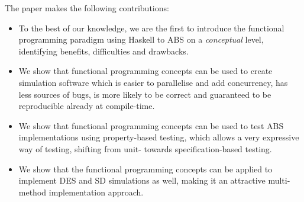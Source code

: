The paper makes the following contributions:

\begin{itemize}
	\item To the best of our knowledge, we are the first to introduce the functional programming paradigm using Haskell to ABS on a \textit{conceptual} level, identifying benefits, difficulties and drawbacks.
	\item We show that functional programming concepts can be used to create simulation software which is easier to parallelise and add concurrency, has less sources of bugs, is more likely to be correct and guaranteed to be reproducible already at compile-time.
	\item We show that functional programming concepts can be used to test ABS implementations using property-based testing, which allows a very expressive way of testing, shifting from unit- towards specification-based testing.
	\item We show that the functional programming concepts can be applied to implement DES and SD simulations as well, making it an attractive multi-method implementation approach.
\end{itemize}
